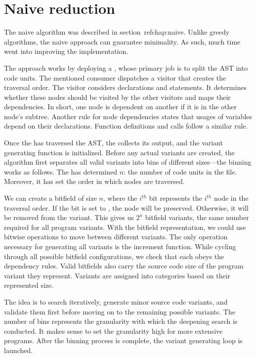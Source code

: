 \section{Naive reduction}

The naive algorithm was described in section~ref{chap:naive}.
Unlike greedy algorithms, the naive approach can guarantee minimality.
As such, much time went into improving the implementation.

The approach works by deploying a , whose 
primary job is to split the AST into code units.
The mentioned consumer dispatches a visitor that creates the traversal order.
The visitor considers declarations and statements.
It determines whether these nodes should be visited by the other visitors and 
maps their dependencies.
In short, one node is dependent on another if it is in the other node's 
subtree.
Another rule for node dependencies states that usages of variables depend on 
their declarations.
Function definitions and calls follow a similar rule.

Once the  has traversed the AST, 
the  collects its output, and the variant 
generating function is initialized.
Before any actual variants are created, the algorithm first separates all 
valid variants into bins of different sizes—the binning works as follows.
The  has determined $n$: the number of code 
units in the file.
Moreover, it has set the order in which nodes are traversed.

We can create a bitfield of size $n$, where the $i^{th}$ bit represents 
the $i^{th}$ node in the traversal order.
If the bit is set to , the node will be preserved.
Otherwise, it will be removed from the variant.
This gives us $2^n$ bitfield variants, the same number required for all 
program variants.
With the bitfield representation, we could use bitwise operations to move 
between different variants.
The only operation necessary for generating all variants is the increment 
function.
While cycling through all possible bitfield configurations, we check that 
each obeys the dependency rules.
Valid bitfields also carry the source code size of the program variant they 
represent.
Variants are assigned into categories based on their represented size.

The idea is to search iteratively, generate minor source code variants, and 
validate them first before moving on to the remaining possible variants.
The number of bins represents the granularity with which the deepening 
search is conducted.
It makes sense to set the granularity high for more extensive programs.
After the binning process is complete, the variant generating loop is 
launched.

